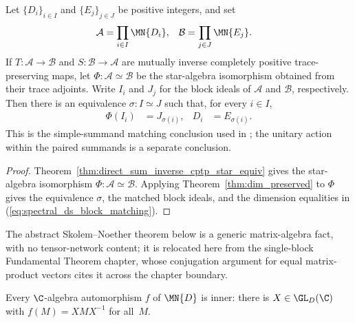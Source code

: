\begin{theorem}%
    \label{thm:direct_sum_inverse_cptp_block_matching}
    \leanok
    Let $\{D_i\}_{i\in I}$ and $\{E_j\}_{j\in J}$ be positive integers, and
    set
    \begin{align}
        \mathcal A
         & =\prod_{i\in I}\MN{D_i},
         &
        \mathcal B
         & =\prod_{j\in J}\MN{E_j}.
        \notag
    \end{align}
    If $T:\mathcal A\to\mathcal B$ and
    $S:\mathcal B\to\mathcal A$ are mutually inverse completely positive
    trace-preserving maps, let $\Phi:\mathcal A\simeq\mathcal B$ be the
    star-algebra isomorphism obtained from their trace adjoints. Write $I_i$
    and $J_j$ for the block ideals of $\mathcal A$ and $\mathcal B$,
    respectively. Then there is an equivalence $\sigma:I\simeq J$ such that,
    for every $i\in I$,
    \begin{align}
        \Phi(I_i)
         & =J_{\sigma(i)},
         &
        D_i
         & =E_{\sigma(i)}.
        \label{eq:spectral_ds_block_matching}
    \end{align}
    This is the simple-summand matching conclusion used in
    \cite[Appendix~C.4, line~1997]{Cirac2016MPDO_arXiv}; the unitary action
    within the paired summands is a separate conclusion.
\end{theorem}

\begin{proof}
    \leanok
    Theorem~\ref{thm:direct_sum_inverse_cptp_star_equiv} gives the
    star-algebra isomorphism $\Phi:\mathcal A\simeq\mathcal B$. Applying
    Theorem~\ref{thm:dim_preserved} to $\Phi$ gives the equivalence $\sigma$,
    the matched block ideals, and the dimension equalities in
    (\ref{eq:spectral_ds_block_matching}).
\end{proof}

The abstract Skolem--Noether theorem below is a generic matrix-algebra fact,
with no tensor-network content; it is relocated here from the single-block
Fundamental Theorem chapter, whose conjugation argument for equal
matrix-product vectors cites it across the chapter boundary.

\begin{theorem}\label{thm:skolem_noether}
    \leanok
    Every $\C$-algebra automorphism $f$ of $\MN{D}$ is inner: there is
    $X \in \GL_D(\C)$ with $f(M) = X M X^{-1}$ for all~$M$.
\end{theorem}

